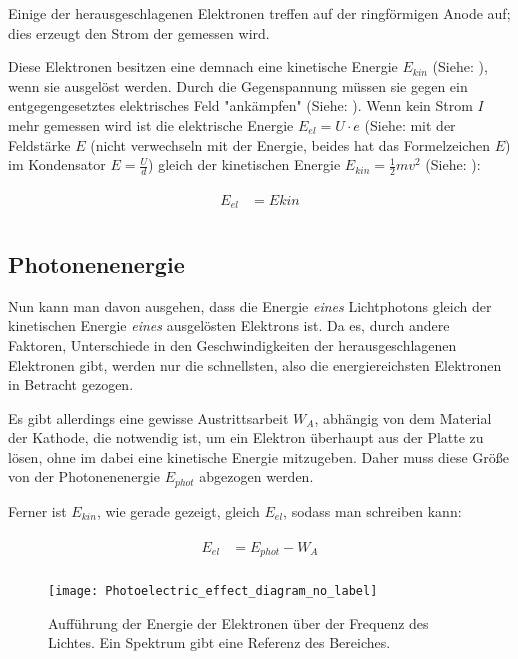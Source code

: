 Einige der herausgeschlagenen Elektronen treffen auf der ringförmigen Anode auf; dies erzeugt den Strom der gemessen wird.

Diese Elektronen besitzen eine demnach eine kinetische Energie $E_{kin}$ (Siehe: ), wenn sie ausgelöst werden. Durch die Gegenspannung müssen sie gegen ein entgegengesetztes elektrisches Feld "ankämpfen" (Siehe: ). Wenn kein Strom $I$ mehr gemessen wird ist die elektrische Energie $E_{el} = U \cdot e$ (Siehe:  mit der Feldstärke $E$ (nicht verwechseln mit der Energie, beides hat das Formelzeichen $E$) im Kondensator $E=\frac{U}{d}$) gleich der kinetischen Energie $E_{kin} = \frac{1}{2} m v^2$ (Siehe: ):

\begin{align}
\begin{split}
	E_{el} &= E{kin} \\
\end{split}
\end{align}


\subsection{Photonenenergie}

Nun kann man davon ausgehen, dass die Energie \emph{eines} Lichtphotons gleich der kinetischen Energie \emph{eines} ausgelösten Elektrons ist. Da es, durch andere Faktoren, Unterschiede in den Geschwindigkeiten der herausgeschlagenen Elektronen gibt, werden nur die schnellsten, also die energiereichsten Elektronen in Betracht gezogen. 

Es gibt allerdings eine gewisse Austrittsarbeit $W_A$, abhängig von dem Material der Kathode, die notwendig ist, um ein Elektron überhaupt aus der Platte zu lösen, ohne im dabei eine kinetische Energie mitzugeben. Daher muss diese Größe von der Photonenenergie $E_{phot}$ abgezogen werden.

Ferner ist $E_{kin}$, wie gerade gezeigt, gleich $E_{el}$, sodass man schreiben kann:

\begin{align} \label{eq:EelmitWA}
\begin{split}
	E_{el} &= E_{phot} - W_A \\
\end{split}
\end{align}

\begin{figure}[h!]
	\centering
	\texttt{[image: Photoelectric\_effect\_diagram\_no\_label]}
	\caption{Aufführung der Energie der Elektronen über der Frequenz des Lichtes. Ein Spektrum gibt eine Referenz des Bereiches.}
	\label{fig:Fotoeffekt}
\end{figure}

